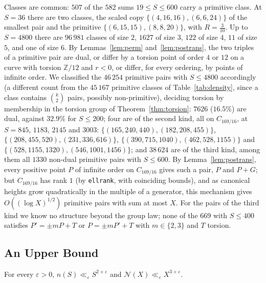 \documentclass[10pt]{article}
\newcommand{\Z}{\mathbb{Z}}
\newcommand{\N}{\mathcal{N}}
\begin{document}
Classes are common: $507$ of the $582$ sums $19\le S\le600$ carry a primitive class. At $S=36$ there are two classes, the scaled copy $\{(4,16,16),(6,6,24)\}$ of the smallest pair and the primitive $\{(6,15,15),(8,8,20)\}$, with $R=\frac3{10}$. Up to $S=4800$ there are $96\,981$ classes of size $2$, $1627$ of size $3$, $122$ of size $4$, $11$ of size $5$, and one of size $6$. By Lemmas~\ref{lem:perm} and~\ref{lem:postrans}, the two triples of a primitive pair are dual, or differ by a torsion point of order $4$ or $12$ on a curve with torsion $\Z/12$ and $r<0$, or differ, for every ordering, by points of infinite order. We classified the $46\,254$ primitive pairs with $S\le4800$ accordingly (a different count from the $45\,167$ primitive classes of Table~\ref{tab:density}, since a class contains $\binom k2$ pairs, possibly non-primitive), deciding torsion by membership in the torsion group of Theorem~\ref{thm:torsion}: $7626$ ($16.5\%$) are dual, against $32.9\%$ for $S\le200$; four are of the second kind, all on $C_{169/16}$, at $S=845$, $1183$, $2145$ and $3003$: $\{(165,240,440),(182,208,455)\}$, $\{(208,455,520),(231,336,616)\}$, $\{(390,715,1040),(462,528,1155)\}$ and $\{(528,1155,1320),(546,1001,1456)\}$; and $38\,624$ are of the third kind, among them all $1330$ non-dual primitive pairs with $S\le600$. By Lemma~\ref{lem:postrans}, every positive point $P$ of infinite order on $C_{169/16}$ gives such a pair, $P$ and $P+G$; but $C_{169/16}$ has rank $1$ (by \texttt{ellrank}, with coinciding bounds), and as canonical heights grow quadratically in the multiple of a generator, this mechanism gives $O((\log X)^{1/2})$ primitive pairs with sum at most $X$. For the pairs of the third kind we know no structure beyond the group law; none of the $669$ with $S\le400$ satisfies $P'=\pm mP+T$ or $P=\pm mP'+T$ with $m\in\{2,3\}$ and $T$ torsion.

\subsection{An Upper Bound}

\begin{proposition}\label{prop:upper}
For every $\varepsilon>0$, $n(S)\ll_\varepsilon S^{2+\varepsilon}$ and $\N(X)\ll_\varepsilon X^{3+\varepsilon}$.
\end{proposition}
\end{document}
